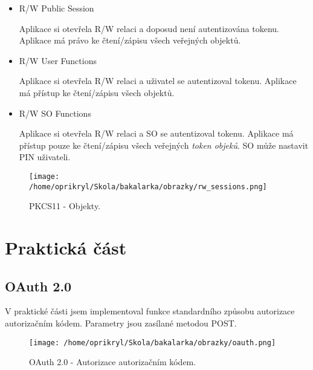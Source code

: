 \documentclass[]{fithesis3}
\begin{document}
		\begin{itemize}
			\item R/W Public Session

			Aplikace si otevřela R/W relaci a doposud není autentizována tokenu. Aplikace má 				právo ke čtení/zápisu všech veřejných objektů.
	
			\item R/W User Functions

			Aplikace si otevřela R/W relaci a uživatel se autentizoval tokenu. Aplikace má přístup 			ke čtení/zápisu všech objektů.

			\item R/W SO Functions

			Aplikace si otevřela R/W relaci a SO se autentizoval tokenu. Aplikace má přístup 					pouze ke čtení/zápisu všech veřejných \textit{token objeků}. SO může nastavit PIN 				uživateli.
		\end{itemize}

		\begin{figure}[!ht]
  			\begin{minipage}{1.00\textwidth}
    				\texttt{[image: /home/oprikryl/Skola/bakalarka/obrazky/rw\_sessions.png]}
  			\end{minipage}
 			\caption{PKCS11 - Objekty.}
  			\label{fig:PKCS11 - Objekty.}
		\end{figure}	
		
\chapter{Praktická část}

	\section{OAuth 2.0}

	V praktické části jsem implementoval funkce standardního způsobu autorizace 					autorizačním kódem. Parametry jsou zasílané metodou POST.

	\begin{figure}[!ht]
		\begin{center}
  		\begin{minipage}{1.00\textwidth}
    			\texttt{[image: /home/oprikryl/Skola/bakalarka/obrazky/oauth.png]}
  		\end{minipage}
		\end{center}
 		\caption{OAuth 2.0 - Autorizace autorizačním kódem.}
  		\label{fig:oauth}
	\end{figure}
\end{document}

